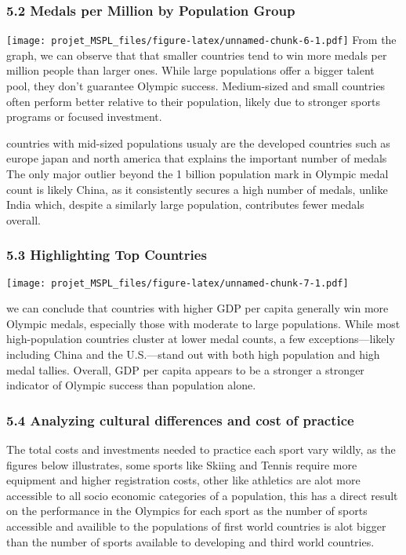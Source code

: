 \documentclass[
]{article}
\begin{document}
\subsubsection{5.2 Medals per Million by Population
Group}\label{medals-per-million-by-population-group}

\texttt{[image: projet\_MSPL\_files/figure-latex/unnamed-chunk-6-1.pdf]}
From the graph, we can observe that that smaller countries tend to win
more medals per million people than larger ones. While large populations
offer a bigger talent pool, they don't guarantee Olympic success.
Medium-sized and small countries often perform better relative to their
population, likely due to stronger sports programs or focused
investment.

countries with mid-sized populations usualy are the developed countries
such as europe japan and north america that explains the important
number of medals The only major outlier beyond the 1 billion population
mark in Olympic medal count is likely China, as it consistently secures
a high number of medals, unlike India which, despite a similarly large
population, contributes fewer medals overall.

\subsubsection{5.3 Highlighting Top
Countries}\label{highlighting-top-countries}

\texttt{[image: projet\_MSPL\_files/figure-latex/unnamed-chunk-7-1.pdf]}

we can conclude that countries with higher GDP per capita generally win
more Olympic medals, especially those with moderate to large
populations. While most high-population countries cluster at lower medal
counts, a few exceptions---likely including China and the U.S.---stand
out with both high population and high medal tallies. Overall, GDP per
capita appears to be a stronger a stronger indicator of Olympic success
than population alone.

\subsubsection{5.4 Analyzing cultural differences and cost of
practice}\label{analyzing-cultural-differences-and-cost-of-practice}

The total costs and investments needed to practice each sport vary
wildly, as the figures below illustrates, some sports like Skiing and
Tennis require more equipment and higher registration costs, other like
athletics are alot more accessible to all socio economic categories of a
population, this has a direct result on the performance in the Olympics
for each sport as the number of sports accessible and availible to the
populations of first world countries is alot bigger than the number of
sports available to developing and third world countries.
\end{document}
